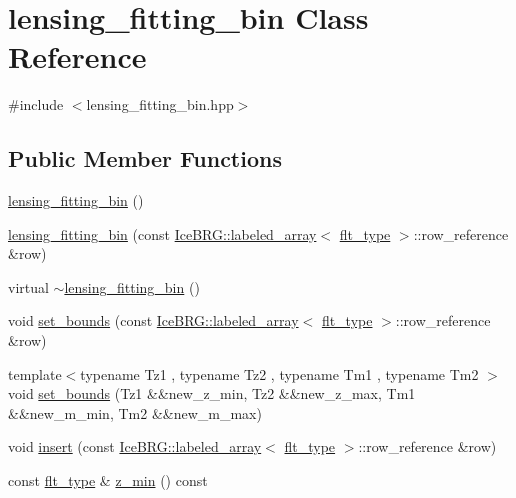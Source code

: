 \hypertarget{classlensing__fitting__bin}{}\section{lensing\+\_\+fitting\+\_\+bin Class Reference}
\label{classlensing__fitting__bin}


{\ttfamily \#include $<$lensing\+\_\+fitting\+\_\+bin.\+hpp$>$}

\subsection*{Public Member Functions}
\begin{DoxyCompactItemize}
\item 
\hyperlink{classlensing__fitting__bin_a07c2e5fbe3b49afcd5942e5eb77b9b0c}{lensing\+\_\+fitting\+\_\+bin} ()
\item 
\hyperlink{classlensing__fitting__bin_aff68c63086756b4270fe2c5a668e68b1}{lensing\+\_\+fitting\+\_\+bin} (const \hyperlink{classIceBRG_1_1labeled__array}{Ice\+B\+R\+G\+::labeled\+\_\+array}$<$ \hyperlink{lib_2IceBRG__main_2common_8h_ad0f130a56eeb944d9ef2692ee881ecc4}{flt\+\_\+type} $>$\+::row\+\_\+reference \&row)
\item 
virtual \hyperlink{classlensing__fitting__bin_a3ad3ccade2555b458efa76c832fcf948}{$\sim$lensing\+\_\+fitting\+\_\+bin} ()
\item 
void \hyperlink{classlensing__fitting__bin_af10c4cbbf9edc182e604812679828641}{set\+\_\+bounds} (const \hyperlink{classIceBRG_1_1labeled__array}{Ice\+B\+R\+G\+::labeled\+\_\+array}$<$ \hyperlink{lib_2IceBRG__main_2common_8h_ad0f130a56eeb944d9ef2692ee881ecc4}{flt\+\_\+type} $>$\+::row\+\_\+reference \&row)
\item 
{\footnotesize template$<$typename Tz1 , typename Tz2 , typename Tm1 , typename Tm2 $>$ }\\void \hyperlink{classlensing__fitting__bin_a716b1b130506a8aae58b3c0f26b0c166}{set\+\_\+bounds} (Tz1 \&\&new\+\_\+z\+\_\+min, Tz2 \&\&new\+\_\+z\+\_\+max, Tm1 \&\&new\+\_\+m\+\_\+min, Tm2 \&\&new\+\_\+m\+\_\+max)
\item 
void \hyperlink{classlensing__fitting__bin_ac2d8bdb9de64ae102e431e5ad903edaa}{insert} (const \hyperlink{classIceBRG_1_1labeled__array}{Ice\+B\+R\+G\+::labeled\+\_\+array}$<$ \hyperlink{lib_2IceBRG__main_2common_8h_ad0f130a56eeb944d9ef2692ee881ecc4}{flt\+\_\+type} $>$\+::row\+\_\+reference \&row)
\item 
const \hyperlink{lib_2IceBRG__main_2common_8h_ad0f130a56eeb944d9ef2692ee881ecc4}{flt\+\_\+type} \& \hyperlink{classlensing__fitting__bin_a269de73e0eb9e2633f6c88f091e2c3eb}{z\+\_\+min} () const 

\end{DoxyCompactItemize}
